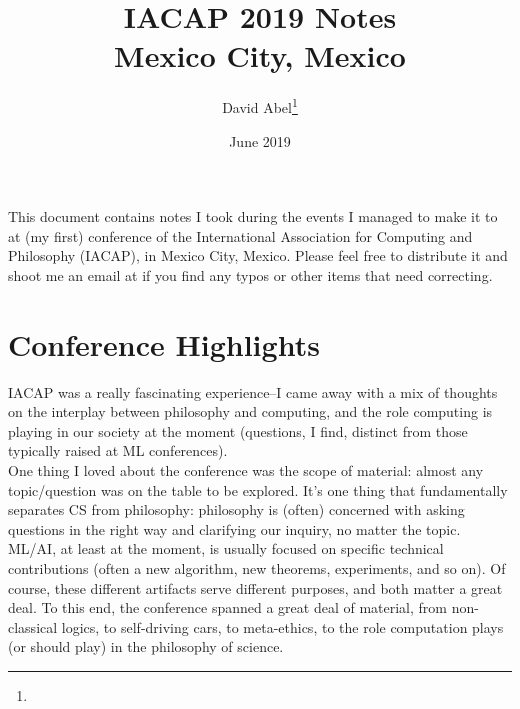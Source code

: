 \documentclass[11pt]{article}
\title{IACAP 2019 Notes \\ \Large{Mexico City, Mexico}}
\author{David Abel\footnote{\durl{http://david-abel.github.io}} \\ \durl{david_abel@brown.edu}}
\date{June 2019}
\begin{document}
\maketitle
\tableofcontents
\newpage


This document contains notes I took during the events I managed to make it to at (my first) conference of the International Association for Computing and Philosophy (IACAP), in Mexico City, Mexico. Please feel free to distribute it and shoot me an email at  if you find any typos or other items that need correcting. 


\section{Conference Highlights}

IACAP was a really fascinating experience--I came away with a mix of thoughts on the interplay between philosophy and computing, and the role computing is playing in our society at the moment (questions, I find, distinct from those typically raised at ML conferences). \\

One thing I loved about the conference was the scope of material: almost any topic/question was on the table to be explored. It's one thing that fundamentally separates CS from philosophy: philosophy is (often) concerned with asking questions in the right way and clarifying our inquiry, no matter the topic. ML/AI, at least at the moment, is usually focused on specific technical contributions (often a new algorithm, new theorems, experiments, and so on). Of course, these different artifacts serve different purposes, and both matter a great deal. To this end, the conference spanned a great deal of material, from non-classical logics, to self-driving cars, to meta-ethics, to the role computation plays (or should play) in the philosophy of science. \\
\end{document}
